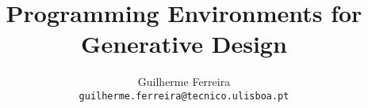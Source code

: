 \documentclass[runningheads,a4paper]{llncs2e/llncs}
\begin{document}
\title{Programming Environments for Generative Design}
\author{Guilherme Ferreira \\ \texttt{guilherme.ferreira@tecnico.ulisboa.pt}}

\maketitle


%







%

% 
% 
 

 
\end{document}
